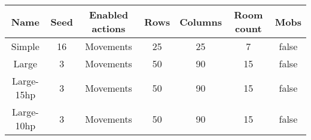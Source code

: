 \begin{tabular}{|c|c|c|c|c|c|c|}
\hline
Name & Seed & Enabled actions & Rows & Columns & Room count & Mobs\\
\hline
Simple & 16 & Movements & 25 & 25 & 7 & false\\
Large & 3 & Movements & 50 & 90 & 15 & false\\
Large-15hp & 3 & Movements & 50 & 90 & 15 & false\\
Large-10hp & 3 & Movements & 50 & 90 & 15 & false\\
\hline
\end{tabular}